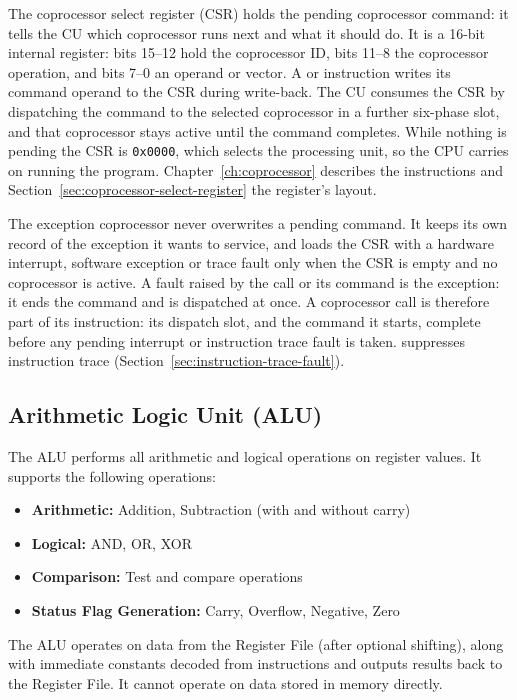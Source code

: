 The coprocessor select register (CSR) holds the pending coprocessor command: it tells the CU which coprocessor runs
next and what it should do. It is a 16-bit internal register: bits 15--12 hold the coprocessor ID, bits 11--8 the
coprocessor operation, and bits 7--0 an operand or vector. A  or  instruction writes its
command operand to the CSR during write-back. The CU consumes the CSR by dispatching the command to the selected
coprocessor in a further six-phase slot, and that coprocessor stays active until the command completes. While nothing
is pending the CSR is \texttt{0x0000}, which selects the processing unit, so the CPU carries on running the program.
Chapter~\ref{ch:coprocessor} describes the instructions and Section~\ref{sec:coprocessor-select-register} the
register's layout.

The exception coprocessor never overwrites a pending command. It keeps its own record of the exception it wants to
service, and loads the CSR with a hardware interrupt, software exception or trace fault only when the CSR is empty and
no coprocessor is active. A fault raised by the call or its command is the exception: it ends the command and is
dispatched at once. A coprocessor call is therefore part of its instruction: its dispatch slot, and the command it
starts, complete before any pending interrupt or instruction trace fault is taken.  suppresses
instruction trace (Section~\ref{sec:instruction-trace-fault}).

\subsection{Arithmetic Logic Unit (ALU)}

The ALU performs all arithmetic and logical operations on register values. It supports the following operations:

\begin{itemize}
	\item \textbf{Arithmetic:} Addition, Subtraction (with and without carry)
	\item \textbf{Logical:} AND, OR, XOR
	\item \textbf{Comparison:} Test and compare operations
	\item \textbf{Status Flag Generation:} Carry, Overflow, Negative, Zero
\end{itemize}

The ALU operates on data from the Register File (after optional shifting), along with immediate constants decoded from
instructions and outputs results back to the Register File. It cannot operate on data stored in memory directly.

